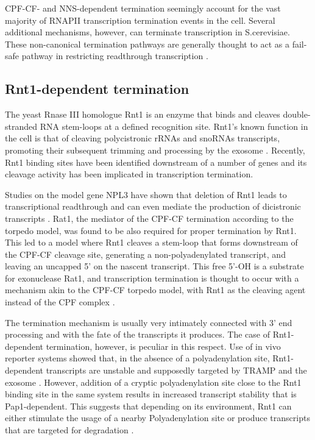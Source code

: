 CPF-CF- and NNS-dependent termination seemingly account for the vast majority of RNAPII transcription termination events in the cell.
Several additional mechanisms, however, can terminate transcription in S.cerevisiae. 
These non-canonical termination pathways are generally thought to act as a fail-safe pathway in restricting readthrough transcription \cite{colin:2014:roadblock,ghazal:2005:genomewide}.


\subsection{Rnt1-dependent termination}

The yeast Rnase III homologue Rnt1 is an enzyme that binds and cleaves double-stranded RNA stem-loops at a defined recognition site. 
Rnt1’s known function in the cell is that of cleaving polycistronic rRNAs and snoRNAs transcripts, promoting their subsequent trimming and processing by the exosome \cite{ghazal:2005:genomewide}. 
Recently, Rnt1 binding sites have been identified downstream of a number of genes and its cleavage activity has been implicated in transcription termination.

Studies on the model gene NPL3 have shown that deletion of Rnt1 leads to transcriptional readthrough and can even mediate the production of dicistronic transcripts \cite{ghazal:2009:yeast}. 
Rat1, the mediator of the CPF-CF termination according to the torpedo model, was found to be also required for proper termination by Rnt1. 
This led to a model where Rnt1 cleaves a stem-loop that forms downstream of the CPF-CF cleavage site, generating a non-polyadenylated transcript, and leaving an uncapped 5’ on the nascent transcript. 
This free 5’-OH is a substrate for exonuclease Rat1, and transcription termination is thought to occur with a mechanism akin to the CPF-CF torpedo model, with Rnt1 as the cleaving agent instead of the CPF complex  \cite{ghazal:2009:yeast, rondo:2009:failsafe}.

The termination mechanism is usually very intimately connected with 3’ end processing and with the fate of the transcripts it produces. The case of Rnt1-dependent termination, however, is peculiar in this respect.
Use of in vivo reporter systems showed that, in the absence of a polyadenylation site, Rnt1-dependent transcripts are unstable and supposedly targeted by TRAMP and the exosome \cite{ghazal:2009:yeast}. 
However, addition of a cryptic polyadenylation site close to the Rnt1 binding site in the same system results in increased transcript stability that is Pap1-dependent. 
This suggests that depending on its environment, Rnt1 can either stimulate the usage of a nearby Polyadenylation site or produce transcripts that are targeted for degradation \cite{rondo:2009:failsafe}.

